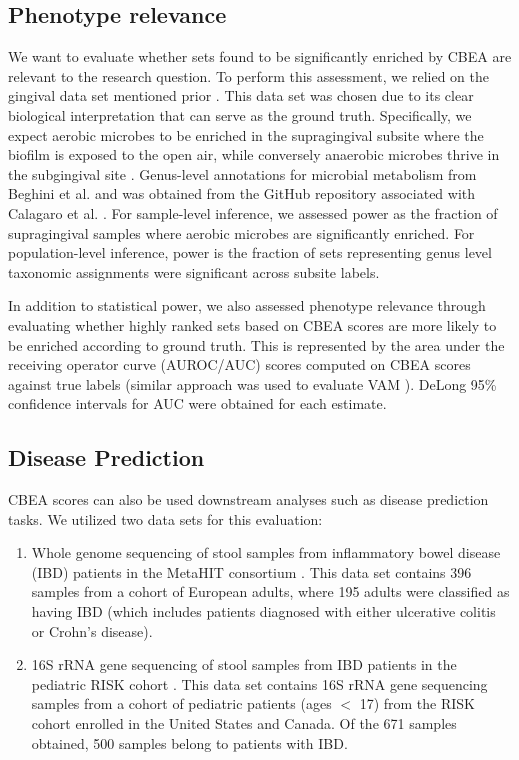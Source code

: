 \documentclass[10pt,letterpaper]{article}
\begin{document}
\subsection*{Phenotype relevance}
We want to evaluate whether sets found to be significantly enriched by CBEA are relevant to the research question. To perform this assessment, we relied on the gingival data set mentioned prior \cite{consortium2012, proctor2019}. This data set was chosen due to its clear biological interpretation that can serve as the ground truth. Specifically, we expect aerobic microbes to be enriched in the supragingival subsite where the biofilm is exposed to the open air, while conversely anaerobic microbes thrive in the subgingival site \cite{thurnheer2016}. Genus-level annotations for microbial metabolism from Beghini et al. \cite{beghini2019} and was obtained from the GitHub repository associated with Calagaro et al. \cite{matteocalgaro2020}. For sample-level inference, we assessed power as the fraction of supragingival samples where aerobic microbes are significantly enriched. For population-level inference, power is the fraction of sets representing genus level taxonomic assignments were significant across subsite labels.  

In addition to statistical power, we also assessed phenotype relevance through evaluating whether highly ranked sets based on CBEA scores are more likely to be enriched according to ground truth. This is represented by the area under the receiving operator curve (AUROC/AUC) scores computed on CBEA scores against true labels (similar approach was used to evaluate VAM \cite{frost2020}). DeLong 95\% confidence intervals for AUC \cite{delong1988} were obtained for each estimate. 

\subsection*{Disease Prediction}
CBEA scores can also be used downstream analyses such as disease prediction tasks. We utilized two data sets for this evaluation: 

\begin{enumerate}
\item Whole genome sequencing of stool samples from inflammatory bowel disease (IBD) patients in the MetaHIT consortium \cite{nielsen2014}. This data set contains 396 samples from a cohort of European adults, where 195 adults were classified as having IBD (which includes patients diagnosed with either ulcerative colitis or Crohn's disease).

\item 16S rRNA gene sequencing of stool samples from IBD patients in the pediatric RISK cohort \cite{gevers2014}. This data set contains 16S rRNA gene sequencing samples from a cohort of pediatric patients (ages $<$ 17) from the RISK cohort enrolled in the United States and Canada. Of the 671 samples obtained, 500 samples belong to patients with IBD.   
\end{enumerate}
\end{document}
